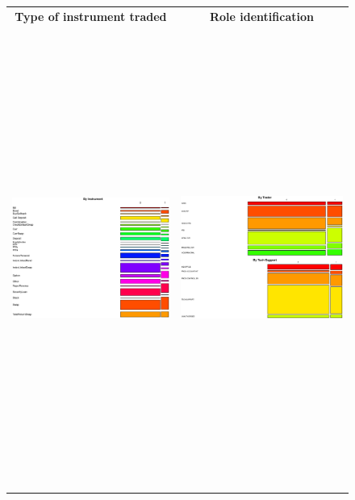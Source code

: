 \documentclass[]{article}
\begin{document}
\begin{figure}
\begin{frame}
      \centering
       \begin{tabular}{cc}
        \textbf{Type of instrument traded} & \textbf{Role identification} \\
        \includegraphics[width=7.5cm,height=15cm]{Single_Instr.eps}
         &
         \includegraphics[width=7.5cm,height=15cm]{Stacked_TrId_TechSup.eps}

\end{tabular}
\end{frame}
\end{figure}
\end{document}
